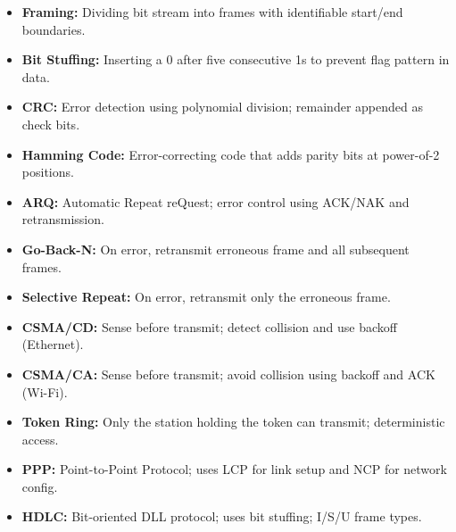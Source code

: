 \documentclass[12pt,a4paper]{article}
\begin{document}
\begin{tcolorbox}[defbox, title={\textbf{One-Line Definitions}}]
\begin{itemize}[leftmargin=*, itemsep=3pt, topsep=0pt]
  \item \textbf{Framing:} Dividing bit stream into frames with identifiable start/end boundaries.
  \item \textbf{Bit Stuffing:} Inserting a 0 after five consecutive 1s to prevent flag pattern in data.
  \item \textbf{CRC:} Error detection using polynomial division; remainder appended as check bits.
  \item \textbf{Hamming Code:} Error-correcting code that adds parity bits at power-of-2 positions.
  \item \textbf{ARQ:} Automatic Repeat reQuest; error control using ACK/NAK and retransmission.
  \item \textbf{Go-Back-N:} On error, retransmit erroneous frame and all subsequent frames.
  \item \textbf{Selective Repeat:} On error, retransmit only the erroneous frame.
  \item \textbf{CSMA/CD:} Sense before transmit; detect collision and use backoff (Ethernet).
  \item \textbf{CSMA/CA:} Sense before transmit; avoid collision using backoff and ACK (Wi-Fi).
  \item \textbf{Token Ring:} Only the station holding the token can transmit; deterministic access.
  \item \textbf{PPP:} Point-to-Point Protocol; uses LCP for link setup and NCP for network config.
  \item \textbf{HDLC:} Bit-oriented DLL protocol; uses bit stuffing; I/S/U frame types.
\end{itemize}
\end{tcolorbox}

\vspace{6pt}
\end{document}
